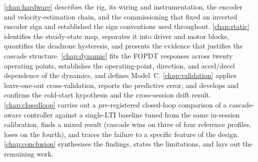 \cref{chap:hardware} describes the rig, its wiring and instrumentation, the encoder and velocity-estimation chain, and the commissioning that fixed an inverted encoder sign and established the sign conventions used throughout. \cref{chap:static} identifies the steady-state map, separates it into driver and motor blocks, quantifies the deadzone hysteresis, and presents the evidence that justifies the cascade structure. \cref{chap:dynamic} fits the FOPDT responses across twenty operating points, establishes the operating-point, direction, and accel/decel dependence of the dynamics, and defines Model~C. \cref{chap:validation} applies leave-one-out cross-validation, reports the predictive error, and develops and confirms the cold-start hypothesis and the cross-session drift result. \cref{chap:closedloop} carries out a pre-registered closed-loop comparison of a cascade-aware controller against a single-LTI baseline tuned from the same in-session calibration, finds a mixed result (cascade wins on three of four reference profiles, loses on the fourth), and traces the failure to a specific feature of the design. \cref{chap:conclusion} synthesises the findings, states the limitations, and lays out the remaining work.
